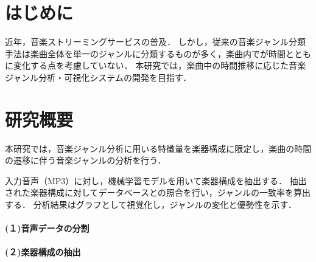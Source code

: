 

\section{はじめに}
近年，音楽ストリーミングサービスの普及．
しかし，従来の音楽ジャンル分類手法は楽曲全体を単一のジャンルに分類するものが多く，楽曲内でが時間とともに変化する点を考慮していない．
%
本研究では，楽曲中の時間推移に応じた音楽ジャンル分析・可視化システムの開発を目指す．


\sectionmargin
\section{研究概要}

本研究では，音楽ジャンル分析に用いる特徴量を楽器構成に限定し，楽曲の時間の遷移に伴う音楽ジャンルの分析を行う．

入力音声（MP3）に対し，機械学習モデルを用いて楽器構成を抽出する\cite{takumi}．
抽出された楽器構成に対してデータベースとの照合を行い，ジャンルの一致率を算出する\cite{maezawa}．
分析結果はグラフとして視覚化し，ジャンルの変化と優勢性を示す．
%

\sectionmargin
\paragraph*{(１)音声データの分割}



\sectionmargin
\paragraph*{(２)楽器構成の抽出}

